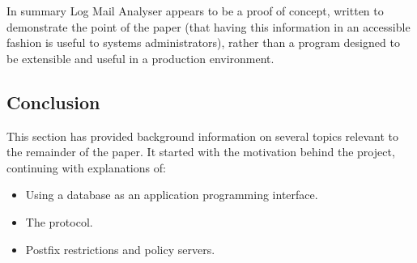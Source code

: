 \documentclass[a4paper,12pt,draft]{article}
\begin{document}
In summary Log Mail Analyser appears to be a proof of concept, written to
demonstrate the point of the paper (that having this information in an
accessible fashion is useful to systems administrators), rather than a
program designed to be extensible and useful in a production environment.

%

\subsection{Conclusion}

This section has provided background information on several topics relevant
to the remainder of the paper.  It started with the motivation behind the
project, continuing with explanations of:

\begin{itemize}

    \item Using a database as an application programming interface.

    \item The \SMTP{} protocol.

    \item Postfix restrictions and policy servers.

\end{itemize}
\end{document}
